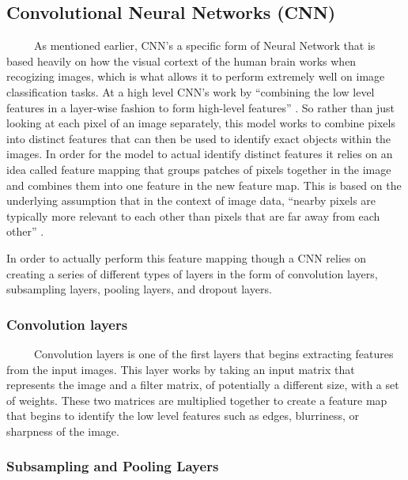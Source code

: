 \documentclass[12pt]{article}
\begin{document}
\hypertarget{convolutional-neural-networks-cnn}{%
\subsection{Convolutional Neural Networks
(CNN)}\label{convolutional-neural-networks-cnn}}

~~~~~As mentioned earlier, CNN's a specific form of Neural Network that
is based heavily on how the visual cortext of the human brain works when
recogizing images, which is what allows it to perform extremely well on
image classification tasks. At a high level CNN's work by ``combining
the low level features in a layer-wise fashion to form high-level
features'' \citet{PML}. So rather than just looking at each pixel of an
image separately, this model works to combine pixels into distinct
features that can then be used to identify exact objects within the
images. In order for the model to actual identify distinct features it
relies on an idea called feature mapping that groups patches of pixels
together in the image and combines them into one feature in the new
feature map. This is based on the underlying assumption that in the
context of image data, ``nearby pixels are typically more relevant to
each other than pixels that are far away from each other'' \citet{PML}.

In order to actually perform this feature mapping though a CNN relies on
creating a series of different types of layers in the form of
convolution layers, subsampling layers, pooling layers, and dropout
layers.

\hypertarget{convolution-layers}{%
\subsubsection{Convolution layers}\label{convolution-layers}}

~~~~~Convolution layers is one of the first layers that begins
extracting features from the input images. This layer works by taking an
input matrix that represents the image and a filter matrix, of
potentially a different size, with a set of weights. These two matrices
are multiplied together to create a feature map that begins to identify
the low level features such as edges, blurriness, or sharpness of the
image.

\hypertarget{subsampling-and-pooling-layers}{%
\subsubsection{Subsampling and Pooling
Layers}\label{subsampling-and-pooling-layers}}
\end{document}
